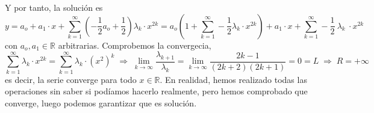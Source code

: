 \begin{eje}
Y por tanto, la solución es $$y=a_o+a_1\cdot x+\sum_{k=1}^{\infty}\left(-\dfrac{1}{2}a_o+\dfrac{1}{2} \right) \lambda_k \cdot x^{2k}=a_o\left( 1+\sum_{k=1}^{\infty} -\dfrac{1}{2} \lambda_k \cdot x^{2k} \right) + a_1 \cdot x + \sum_{k=1}^{\infty} -\dfrac{1}{2} \: \lambda_k \: \cdot x^{2k}$$
con $a_o,a_1 \in \mathbb R$ arbitrarias. Comprobemos la convergecia,
$$\sum_{k=1}^{\infty} \lambda_k \cdot x^{2k}=\sum_{k=1}^{\infty} \lambda_k \cdot (x^2)^k \; \Rightarrow \; \lim_{k \to \infty} \dfrac{\lambda_{k+1}}{\lambda_k}= \lim_{k \to \infty} \dfrac{2k-1}{(2k+2)(2k+1)}=0=L \; \Rightarrow \; R=+\infty$$
es decir, la serie converge para todo $x \in \mathbb R$. En realidad, hemos realizado todas las operaciones sin saber si podíamos hacerlo realmente, pero hemos comprobado que converge, luego podemos garantizar que es solución. 
\end{eje}

